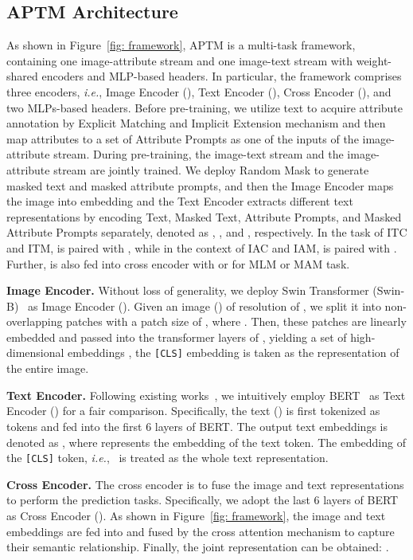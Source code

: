 \documentclass[sigconf]{acmart}
\def\ie{\emph{i.e.}}
\begin{document}
\subsection{APTM Architecture} 
As shown in Figure~\ref{fig: framework}, APTM is a multi-task framework, containing one image-attribute stream and one image-text stream with weight-shared encoders and MLP-based headers. 
In particular, the framework comprises three encoders, \ie, Image Encoder (), Text Encoder (), Cross Encoder (), and two MLPs-based headers.  
Before pre-training, we utilize text to acquire attribute annotation by Explicit Matching and Implicit Extension mechanism and then map attributes to a set of Attribute Prompts as one of the inputs of the image-attribute stream. 
During pre-training, the image-text stream and the image-attribute stream are jointly trained. We deploy Random Mask to generate masked text and masked attribute prompts, and then the Image Encoder maps the image into embedding  and the Text Encoder extracts different text representations by encoding Text, Masked Text, Attribute Prompts, and Masked Attribute Prompts separately, denoted as , ,  and , respectively. 
In the task of ITC and ITM,  is paired with , while in the context of IAC and IAM,  is paired with . Further,  is also fed into cross encoder with  or  for MLM or MAM task.


\noindent\textbf{Image Encoder.} 
Without loss of generality, we deploy Swin Transformer (Swin-B)~\cite{liu2021swintransformer} as Image Encoder ().
Given an image () of resolution of , we split it into  non-overlapping patches with a patch size of , where . 
Then, these patches are linearly embedded and passed into the transformer layers of , yielding a set of high-dimensional embeddings , the \texttt{[CLS]} embedding  is taken as the representation of the entire image.


\noindent\textbf{Text Encoder.}
Following existing works~\cite{shu2023see}, we intuitively employ BERT~\cite{kenton2019bert} as Text Encoder () for a fair comparison. Specifically, the text () is first tokenized as  tokens and fed into the first 6 layers of BERT. The output text embeddings  is denoted as , where  represents the embedding of the  text token. The embedding of the \texttt{[CLS]} token, \ie,~ is treated as the whole text representation.


\noindent\textbf{Cross Encoder.}
The cross encoder is to fuse the image and text representations to perform the prediction tasks. Specifically, we adopt the last 6 layers of BERT as Cross Encoder (). As shown in Figure~\ref{fig: framework}, the image and text embeddings are fed into  and fused by the cross attention mechanism to capture their semantic relationship. Finally, the joint representation can be obtained: .
\end{document}
